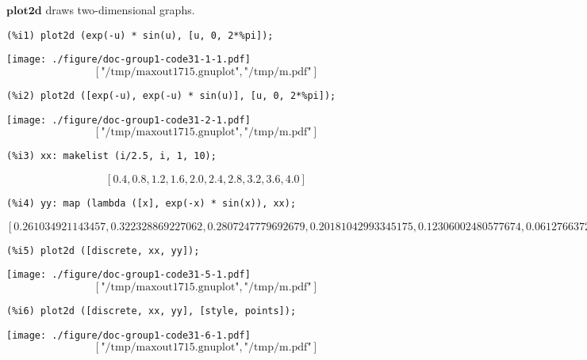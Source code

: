 \documentclass[12pt,leqno]{article}
\begin{document}
$\mathbf{plot2d}$ draws two-dimensional graphs.
\begin{verbatim}
(%i1) plot2d (exp(-u) * sin(u), [u, 0, 2*%pi]);
\end{verbatim}
\texttt{[image: ./figure/doc-group1-code31-1-1.pdf]}
\begin{dmath}[number={\(\mathop{\mathrm{\%o}_{1}}\)}]
\left[\text{"/tmp/maxout1715.gnuplot"}, \text{"/tmp/m.pdf"}\right]
\end{dmath}
\begin{verbatim}
(%i2) plot2d ([exp(-u), exp(-u) * sin(u)], [u, 0, 2*%pi]);
\end{verbatim}
\texttt{[image: ./figure/doc-group1-code31-2-1.pdf]}
\begin{dmath}[number={\(\mathop{\mathrm{\%o}_{2}}\)}]
\left[\text{"/tmp/maxout1715.gnuplot"}, \text{"/tmp/m.pdf"}\right]
\end{dmath}
\begin{verbatim}
(%i3) xx: makelist (i/2.5, i, 1, 10);
\end{verbatim}
\begin{dmath}[number={\(\mathop{\mathrm{\%o}_{3}}\)}]
\left[0.4, 0.8, 1.2, 1.6, 2.0, 2.4, 2.8, 3.2, 3.6, 4.0\right]
\end{dmath}
\begin{verbatim}
(%i4) yy: map (lambda ([x], exp(-x) * sin(x)), xx);
\end{verbatim}
\begin{dmath}[number={\(\mathop{\mathrm{\%o}_{4}}\)}]
\left[0.261034921143457, 0.322328869227062, 0.2807247779692679, 0.20181042993345175, 0.12306002480577674, 0.06127663726195732, 0.020370650389686513, -0.0023794587414574246, -0.012091305769841415, -0.013861321214152955\right]
\end{dmath}
\begin{verbatim}
(%i5) plot2d ([discrete, xx, yy]);
\end{verbatim}
\texttt{[image: ./figure/doc-group1-code31-5-1.pdf]}
\begin{dmath}[number={\(\mathop{\mathrm{\%o}_{5}}\)}]
\left[\text{"/tmp/maxout1715.gnuplot"}, \text{"/tmp/m.pdf"}\right]
\end{dmath}
\begin{verbatim}
(%i6) plot2d ([discrete, xx, yy], [style, points]);
\end{verbatim}
\texttt{[image: ./figure/doc-group1-code31-6-1.pdf]}
\begin{dmath}[number={\(\mathop{\mathrm{\%o}_{6}}\)}]
\left[\text{"/tmp/maxout1715.gnuplot"}, \text{"/tmp/m.pdf"}\right]
\end{dmath}
\end{document}

